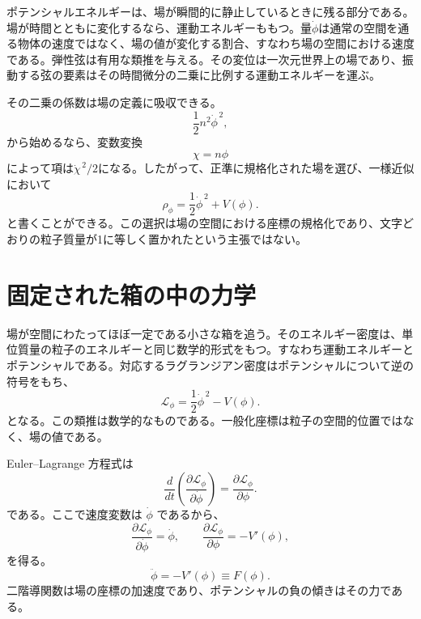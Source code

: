 ポテンシャルエネルギーは、場が瞬間的に静止しているときに残る部分である。場が時間とともに変化するなら、運動エネルギーももつ。量\(\dot\phi\)は通常の空間を通る物体の速度ではなく、場の値が変化する割合、すなわち場の空間における速度である。弾性弦は有用な類推を与える。その変位は一次元世界上の場であり、振動する弦の要素はその時間微分の二乗に比例する運動エネルギーを運ぶ。

その二乗の係数は場の定義に吸収できる。
\begin{equation}
\frac12 n^2\dot\phi^{\,2},
\end{equation}
から始めるなら、変数変換
\begin{equation}
\chi=n\phi
\end{equation}
によって項は\(\dot\chi^{\,2}/2\)になる。したがって、正準に規格化された場を選び、一様近似において
\begin{equation}
\rho_\phi=\frac12\dot\phi^{\,2}+V(\phi).
\label{eq:c09-rho-homogeneous}
\end{equation}
と書くことができる。この選択は場の空間における座標の規格化であり、文字どおりの粒子質量が1に等しく置かれたという主張ではない。

\section{固定された箱の中の力学}

場が空間にわたってほぼ一定である小さな箱を追う。そのエネルギー密度は、単位質量の粒子のエネルギーと同じ数学的形式をもつ。すなわち運動エネルギーとポテンシャルである。対応するラグランジアン密度はポテンシャルについて逆の符号をもち、
\begin{equation}
\mathcal L_\phi
=\frac12\dot\phi^{\,2}-V(\phi).
\label{eq:c09-lagrangian-density}
\end{equation}
となる。この類推は数学的なものである。一般化座標は粒子の空間的位置ではなく、場の値である。

Euler--Lagrange 方程式は
\begin{equation}
\frac{d}{dt}
\left(
\frac{\partial\mathcal L_\phi}{\partial\dot\phi}
\right)
=
\frac{\partial\mathcal L_\phi}{\partial\phi}.
\label{eq:c09-el-fixed}
\end{equation}
である。ここで速度変数は \(\dot\phi\) であるから、
\begin{equation}
\frac{\partial\mathcal L_\phi}{\partial\dot\phi}=\dot\phi,
\qquad
\frac{\partial\mathcal L_\phi}{\partial\phi}=-V'(\phi),
\end{equation}
を得る。
\begin{equation}
\ddot\phi=-V'(\phi)\equiv F(\phi).
\label{eq:c09-fixed-eom}
\end{equation}
二階導関数は場の座標の加速度であり、ポテンシャルの負の傾きはその力である。

